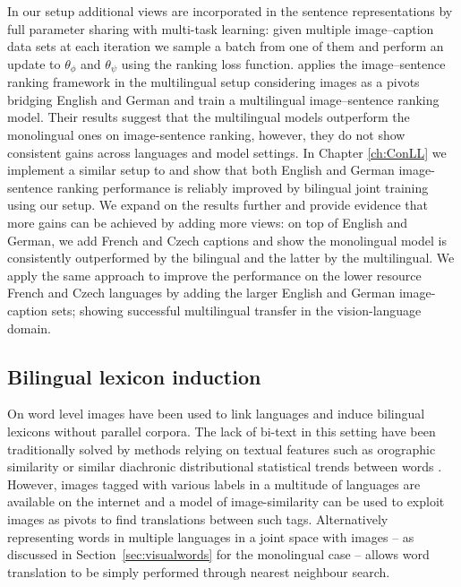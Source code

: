 In our setup additional views are incorporated in the sentence representations
by full parameter sharing with multi-task learning:
given multiple image--caption data sets at each iteration we sample
a batch from one of them and perform an update  to $\theta_{\phi}$ and $\theta_{\psi}$
using the ranking loss function.
\cite{gella2017image} applies the image--sentence ranking framework in the multilingual setup
considering images as a pivots bridging English and German and train a multilingual
image--sentence ranking model.
Their results suggest that the multilingual models outperform the monolingual ones on image-sentence
ranking, however, they do not show consistent gains across languages and model settings.
In Chapter \ref{ch:ConLL} we implement a similar setup to \cite{gella2017image}
and  show that both English and German image-sentence
ranking performance is reliably improved by bilingual joint training using our setup.
We expand on the results further and provide evidence that more gains can be
achieved by adding more views: on top of English and German, we
add French and Czech captions and show the monolingual model is consistently
outperformed by the bilingual and the latter by the multilingual.
We apply the same approach to improve the performance on the lower resource
French and Czech languages by adding the larger
English and German image-caption sets; showing successful multilingual
transfer in the vision-language domain.


\subsection{Bilingual lexicon induction}
\label{sec:bilinglex}

On word level images have been used to link languages and induce bilingual
lexicons without parallel corpora. The lack of bi-text in this setting have
been traditionally solved by methods relying on textual features
such as orographic similarity \citep{haghighi2008learning} or similar diachronic distributional
statistical trends between words \citep{schafer2002inducing}.
However, images tagged with various labels in a multitude of languages are
available on the internet and a model of image-similarity can be used to exploit
images as pivots to find translations between such tags. Alternatively representing words in multiple
languages in a joint space with images
-- as discussed in Section~\ref{sec:visualwords} for the monolingual case --
allows word translation to be simply performed through nearest neighbour search.

